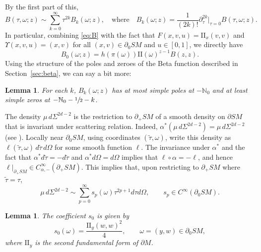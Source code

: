 \documentclass[11pt]{article}
\theoremstyle{plain}
\newtheorem{Lemma}[Theorem]{Lemma}
\theoremstyle{definition}
\theoremstyle{remark}
\def\Nm{{\mathbb{N}}}
\def\two{\mathrm{II}}
\newcommand{\del}{\partial}
\begin{document}
By the first part of this,
\begin{equation}
B(\tau,\omega; z) \sim \sum_{k=0}^\infty \tau^{2k} B_{k}(\omega; z), \quad \mbox{where}\quad B_k(\omega; z) =
\frac{1}{(2k)!}\partial_\tau^{2k}|_{\tau=0} B(\tau,\omega; z).
\label{eq:Bexpansion}
\end{equation}
In particular, combining \eqref{eq:B} with the fact that $F(x,v,u) = \two_x(v,v)$ and $\Upsilon(x,v,u) = (x,v)$ for all $(x,v)\in \partial_0 SM$ and $u\in [0,1]$, we directly have
\begin{equation*}
B_0(\omega; z) = h(\pi(\omega)) \two(\omega)^{z-1} B(z,z).
\end{equation*}
Using the structure of the poles and zeroes of the Beta function described in Section~\ref{sec:beta}, we can say a bit more:
\begin{Lemma}\label{lem:Bk}
For each $k$, $B_k(\omega; z)$ has at most simple poles at $-\Nm_0$ and at least simple zeros at $-\Nm_0 - \sfrac{1}{2} - k$.
\end{Lemma}

The density $\mu \, d\Sigma^{2d-2}$ is the restriction to $\partial_+ SM$ of a smooth density on $\partial SM$ that is invariant under scattering relation. Indeed, $\alpha^* (\mu \, d\Sigma^{2d-2}) = \mu \, d\Sigma^{2d-2}$ (see \cite[Prop.\,3.6.10]{Paternain2021}).
Locally near $\partial_0 SM$, using coordinates $(\tilde\tau,\omega)$, write this density as $\ell(\tilde\tau, \omega)\,d\tilde\tau\,d\Omega$
for some smooth function $\ell$. The invariance under $\alpha^*$ and the fact that $\alpha^* d\tilde\tau = -d\tilde\tau$ and
$\alpha^* d\Omega = d\Omega$ implies that $\ell\circ \alpha = -\ell$, and hence $\ell|_{\partial_+ SM} \in C_{\alpha,-}^\infty(\partial_+ SM)$. This implies that, upon restricting to $\partial_+ SM$ where $\tilde\tau = \tau$,
\begin{equation}
\mu \, d\Sigma^{2d-2} \sim \sum_{p=0}^\infty s_{p} (\omega) \tau^{2p+1} d\tau d\Omega, \qquad s_{p}\in C^\infty(\partial_0 SM).
\label{eq:musig_expansion}
\end{equation}

\begin{Lemma}\label{lem:s0}
The coefficient $s_0$ is given by
\begin{equation}
s_0(\omega) = \frac{\two_y(w,w)^2}{4}, \qquad \omega = (y,w)\in \partial_0 SM,
\label{eq:s0}
\end{equation}
where $\two_y$ is the second fundamental form of $\del M$.
\end{Lemma}
\end{document}
